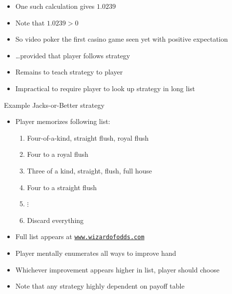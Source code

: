 \documentclass[xcolor=dvipsnames]{beamer}
\theoremstyle{definition}
\begin{document}
\begin{frame}
\begin{itemize}
\item One such calculation gives $1.0239$
\item Note that $1.0239>0$
\item So video poker the first casino game seen
yet with positive expectation
\item \dots provided that player follows strategy
\item Remains to teach strategy to player
\item Impractical to require player to look up strategy
in long list
\end{itemize}
\end{frame}

\begin{frame}{Example Jacks-or-Better strategy}
\begin{itemize}
\item Player memorizes following list:
\begin{enumerate}
\item Four-of-a-kind, straight flush, royal flush
\item Four to a royal flush
\item Three of a kind, straight, flush, full house
\item Four to a straight flush
\item[]$\vdots$
\setcounter{enumi}{15}
\item Discard everything
\end{enumerate}
\item Full list appears at \href{http://wizardofodds.com/games/video-poker/strategy/jacks-or-better/9-6/simple}{\color{blue}\tt www.wizardofodds.com}
\item Player mentally enumerates all ways to improve hand
\item Whichever improvement appears higher in list,
player should choose
\item Note that any strategy highly dependent
on payoff table
\end{itemize}
\end{frame}
\end{document}
